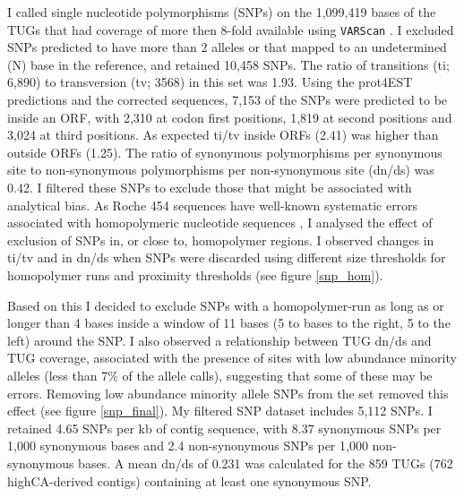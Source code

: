 I called single nucleotide polymorphisms (SNPs) on the 1,099,419 bases
of the TUGs that had coverage of more then 8-fold available using
\texttt{VARScan} \cite{pmid19542151}. I excluded SNPs predicted to
have more than 2 alleles or that mapped to an undetermined (N) base in
the reference, and retained 10,458 SNPs. The ratio of transitions (ti;
6,890) to transversion (tv; 3568) in this set was 1.93. Using the
prot4EST predictions and the corrected sequences, 7,153 of the SNPs
were predicted to be inside an ORF, with 2,310 at codon first
positions, 1,819 at second positions and 3,024 at third positions. As
expected ti/tv inside ORFs (2.41) was higher than outside ORFs
(1.25). The ratio of synonymous polymorphisms per synonymous site to
non-synonymous polymorphisms per non-synonymous site (dn/ds) was
0.42. I filtered these SNPs to exclude those that might be associated
with analytical bias. As Roche 454 sequences have well-known
systematic errors associated with homopolymeric nucleotide sequences
\cite{pmid21685085}, I analysed the effect of exclusion of SNPs in, or
close to, homopolymer regions. I observed changes in ti/tv and in
dn/ds when SNPs were discarded using different size thresholds for
homopolymer runs and proximity thresholds (see figure \ref{snp_hom}).


Based on this I decided to exclude SNPs with a homopolymer-run as long
as or longer than 4 bases inside a window of 11 bases (5 to bases to
the right, 5 to the left) around the SNP. I also observed a
relationship between TUG dn/ds and TUG coverage, associated with the
presence of sites with low abundance minority alleles (less than 7\%
of the allele calls), suggesting that some of these may be errors.
Removing low abundance minority allele SNPs from the set removed this
effect (see figure \ref{snp_final}). My filtered SNP dataset
includes 5,112 SNPs. I retained 4.65 SNPs per kb of contig sequence,
with 8.37 synonymous SNPs per 1,000 synonymous bases and 2.4
non-synonymous SNPs per 1,000 non-synonymous bases. A mean dn/ds of
0.231 was calculated for the 859 TUGs (762 highCA-derived contigs)
containing at least one synonymous SNP.

